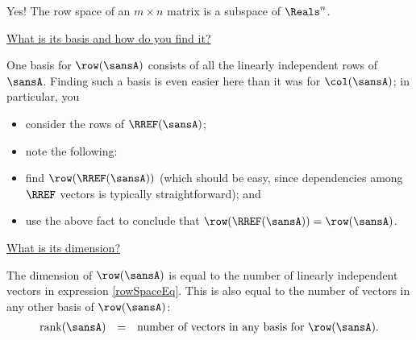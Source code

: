 \documentclass[12 pt]{article}
\begin{document}
Yes! The row space of an $m\times n$ matrix is a subspace of $\Reals^n$. 

\vspace{6mm}

\noindent\ul{What is its basis and how do you find it?}

One basis for $\row(\sansA)$ consists of all the linearly independent rows of $\sansA$. Finding such a basis is even easier here than it was for $\col(\sansA)$; in particular, you 

\begin{itemize}
	\item consider the rows of $\RREF(\sansA)$; 
	
	\item note the following:
	
	
	\item find $\row(\RREF(\sansA))$ (which should be easy, since dependencies among $\RREF$ vectors is typically straightforward); and
	
	\item use the above fact to conclude that $\row(\RREF(\sansA))=\row(\sansA)$.
\end{itemize}

\vspace{6mm}

\noindent\ul{What is its dimension?}

The dimension of $\row(\sansA)$ is equal to the number of linearly independent vectors in expression \eqref{rowSpaceEq}. This is also equal to the number of vectors in any other basis of $\row(\sansA)$:
\[
\begin{array}{rcl}
\rank(\sansA) & = & \text{number of vectors in any basis for $\row(\sansA)$}.
\end{array}
\]

\end{document}
